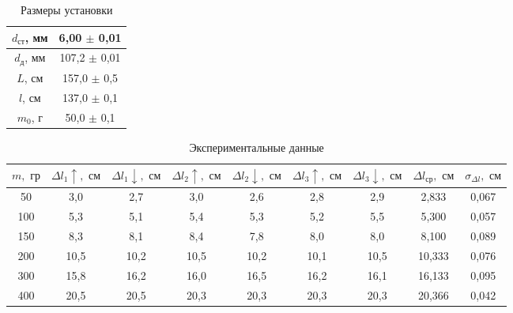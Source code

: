 \documentclass[a4paper, 12pt]{article}
\begin{document}
    \begin{center}
    
    \begin{table}[h!]
        \begin{center}
        \begin{tabular}{|c|c|}
        \hline \hline
        $d_{\text{ст}}$, мм & 6,00 $\pm$ 0,01  \\ \hline
        $d_{\text{д}}$, мм  & 107,2 $\pm$ 0,01    \\ \hline
        $L$, см             & 157,0 $\pm$ 0,5     \\ \hline
        $l$, см             & 137,0 $\pm$ 0,1 \\ \hline
        $m_{0}$, г         & 50,0 $\pm$ 0,1   \\ \hline \hline
        \end{tabular}
        \caption{Размеры установки}
        \end{center}
    \end{table}


    \begin{table}[h!]
        \begin{center}
        \begin{tabular}{|c|c|c|c|c|c|c|c|c|}
        \hline \hline
        $m, \text{ гр}$ &  $ \Delta l_1 \uparrow, \text{ см}$ & $ \Delta l_1 \downarrow, \text{ см}$ & $ \Delta l_2 \uparrow, \text{ см}$ & $ \Delta l_2 \downarrow, \text{ см}$ &  $ \Delta l_3 \uparrow, \text{ см}$ & $ \Delta l_3 \downarrow, \text{ см}$ & $\Delta l_{\text{ср}}, \text{ см}$ & $\sigma_{\Delta l}, \text{ см} $ \\ \hline \hline
          50  & 3,0  & 2,7  & 3,0  & 2,6  & 2,8  & 2,9  & 2,833  & 0,067 \\ \hline
          100 & 5,3  & 5,1  & 5,4  & 5,3  & 5,2  & 5,5  & 5,300  & 0,057 \\ \hline
          150 & 8,3  & 8,1  & 8,4  & 7,8  & 8,0  & 8,0  & 8,100  & 0,089 \\ \hline
          200 & 10,5 & 10,2 & 10,5 & 10,2 & 10,1 & 10,5 & 10,333 & 0,076 \\ \hline
          300 & 15,8 & 16,2 & 16,0 & 16,5 & 16,2 & 16,1 & 16,133 & 0,095 \\ \hline
          400 & 20,5 & 20,5 & 20,3 & 20,3 & 20,3 & 20,3 & 20,366 & 0,042 \\ \hline  
        \hline 
        \end{tabular}
    \caption{Экспериментальные данные}
    \end{center}
    \end{table}


\end{center}
\end{document}

